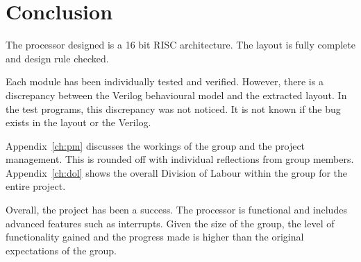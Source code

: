 

\chapter{Conclusion}

The processor designed is a 16 bit RISC architecture.
The layout is fully complete and design rule checked.

Each module has been individually tested and verified.
However, there is a discrepancy between the Verilog behavioural model and the extracted layout.
In the test programs, this discrepancy was not noticed. 
It is not known if the bug exists in the layout or the Verilog.

Appendix~\ref{ch:pm} discusses the workings of the group and the project management.
This is rounded off with individual reflections from group members.
Appendix~\ref{ch:dol} shows the overall Division of Labour within the group for the entire project.

Overall, the project has been a success. 
The processor is functional and includes advanced features such as interrupts.
Given the size of the group, the level of functionality gained and the progress made is higher than the original expectations of the group.
